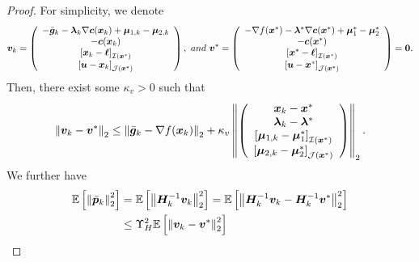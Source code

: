 \documentclass[aos]{imsart}
\numberwithin{equation}{section}
\theoremstyle{plain}
\begin{document}
\begin{appendix}
\begin{proof}
    For simplicity, we denote
    \begin{equation*}
        \bm{v}_k = \left( \begin{array}{c}
        - \Bar{\bm{g}}_k - \bm{\lambda}_{k} \nabla \bm{c}(\bm{x}_k)  + \bm{\mu}_{1,k} - \bm{\mu}_{2,k}\\
        -\bm{c}(\bm{x}_k)\\
        \left[\bm{x}_k - \bm{\ell}\right]_{\mathcal{I}(\bm{x}^{*})}\\
        \left[\bm{u} - \bm{x}_{k}\right]_{\mathcal{J}(\bm{x}^{*})}
       \end{array} \right),~and~ \bm{v}^{*} = \left( \begin{array}{c}
        - \nabla f(\bm{x}^{*}) - \bm{\lambda}^{*} \nabla \bm{c}(\bm{x}^{*})  + \bm{\mu}_{1}^{*} - \bm{\mu}_{2}^{*}\\
        -\bm{c}(\bm{x}^{*})\\
        \left[\bm{x}^{*} - \bm{\ell}\right]_{\mathcal{I}(\bm{x}^{*})}\\
        \left[\bm{u} - \bm{x}^{*}\right]_{\mathcal{J}(\bm{x}^{*})}
       \end{array} \right) = \bm{0}.
    \end{equation*}
    Then, there exist some $\kappa_{v} > 0$ such that
    \begin{equation*}
        \left\| \bm{v}_{k} - \bm{v}^{*} \right\|_2 \leq \left\| \Bar{\bm{g}}_k - \nabla f(\bm{x}_{k}) \right\|_2 + \kappa_{v} \left\|  \left( \begin{array}{c}
    \bm{x}_{k} - \bm{x}^{*}  \\
    \bm{\lambda}_{k} - \bm{\lambda}^{*} \\
    \left[ \bm{\mu}_{1,k} - \bm{\mu}_{1}^{*}\right]_{\mathcal{I}(\bm{x}^{*})} \\
    \left[ \bm{\mu}_{2,k} - \bm{\mu}_{2}^{*} \right]_{\mathcal{J}(\bm{x}^{*})} 
    \end{array} \right)  \right\|_2.
    \end{equation*}
    We further have
    \begin{equation}
    \label{eq33}
        \begin{split}
            \mathbb{E} \left[\left\| \Bar{\bm{p}}_{k}\right\|_2^2 \right] & =  \mathbb{E} \left[\left\| \bm{H}_{k}^{-1} \bm{v}_{k}\right\|_2^2 \right] = \mathbb{E} \left[\left\| \bm{H}_{k}^{-1} \bm{v}_{k} - \bm{H}_{k}^{-1} \bm{v}^{*} \right\|_2^2 \right] \\
            & \leq \Upsilon_{H}^{2} \mathbb{E} \left[\left\|  \bm{v}_{k} - \bm{v}^{*} \right\|_2^2 \right] \\

\end{split}
\end{equation}
\end{proof}
\end{appendix}
\end{document}
